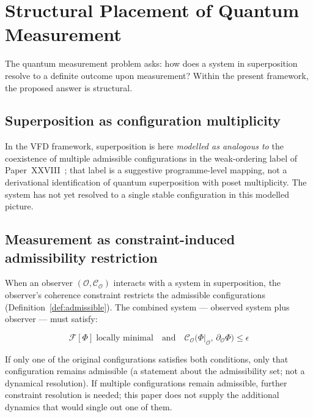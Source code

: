\documentclass[12pt]{article}
\newcommand{\Fcal}{\mathcal{F}}
\newcommand{\Ocal}{\mathcal{O}}
\newcommand{\Ccal}{\mathcal{C}}
\begin{document}
\section{Structural Placement of Quantum Measurement}\label{sec:quantum}

The quantum measurement problem asks: how does a system in superposition resolve to a definite outcome upon measurement? Within the present framework, the proposed answer is structural.

\subsection{Superposition as configuration multiplicity}

In the VFD framework, superposition is here \emph{modelled as analogous to} the coexistence of multiple admissible configurations in the weak-ordering label of Paper~XXVIII~\citep{SmartXXVIII}; that label is a suggestive programme-level mapping, not a derivational identification of quantum superposition with poset multiplicity. The system has not yet resolved to a single stable configuration in this modelled picture.

\subsection{Measurement as constraint-induced admissibility restriction}

When an observer $(\Ocal, \Ccal_\Ocal)$ interacts with a system in superposition, the observer's coherence constraint restricts the admissible configurations (Definition~\ref{def:admissible}). The combined system --- observed system plus observer --- must satisfy:

\begin{equation}\label{eq:measurement}
    \Fcal[\Phi] \;\text{locally minimal} \quad \text{and} \quad \Ccal_\Ocal\!\bigl(\Phi|_\Ocal,\, \partial_\Ocal \Phi\bigr) \leq \epsilon
\end{equation}

If only one of the original configurations satisfies both conditions, only that configuration remains admissible (a statement about the admissibility set; not a dynamical resolution). If multiple configurations remain admissible, further constraint resolution is needed; this paper does not supply the additional dynamics that would single out one of them.
\end{document}
